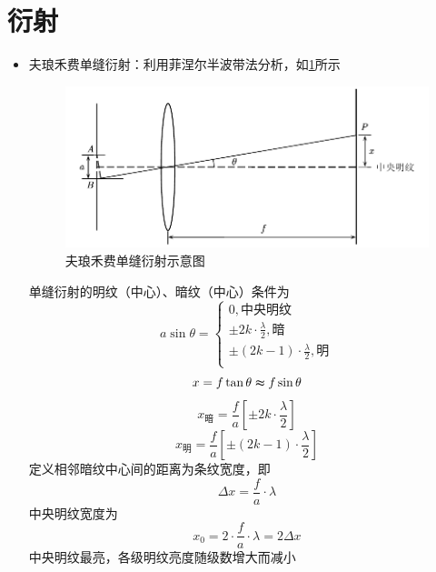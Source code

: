 \documentclass[12pt, a4paper, twoside]{ctexbook}
\begin{document}
\section{衍射}
\begin{itemize}
    \item {\sonti 夫琅禾费单缝衍射}：利用菲涅尔半波带法分析，如\textcolor{blue}{\cref{fig:夫琅禾费单缝衍射}}所示
    \begin{figure}[H]
        \centerline{\includegraphics[scale=0.90]{夫琅禾费单缝衍射.pdf}}
        \caption{夫琅禾费单缝衍射示意图}\label{fig:夫琅禾费单缝衍射}
    \end{figure}
    单缝衍射的明纹（中心）、暗纹（中心）条件为
    $$
    a\sin\theta=\left\{ \begin{array}{l}
        0,\text{中央明纹}\\
        \pm 2k\cdot \frac{\lambda}{2},\text{暗}\\
        \pm \left( 2k-1 \right) \cdot \frac{\lambda}{2},\text{明}\\
    \end{array} \right. 
    $$
    $$
    x=f\tan\theta\thickapprox f\sin\theta
    $$
    $$
    x_\text{暗}=\frac{f}{a}\left[\pm 2k\cdot\frac{\lambda}{2}\right]
    $$
    $$
    x_\text{明}=\frac{f}{a}\left[\pm\left(2k-1\right)\cdot\frac{\lambda}{2}\right]
    $$
    定义相邻暗纹中心间的距离为条纹宽度，即
    $$
    \Delta x=\frac{f}{a}\cdot\lambda
    $$
    中央明纹宽度为
    $$
    x_0=2\cdot\frac{f}{a}\cdot\lambda=2\Delta x
    $$
    中央明纹最亮，各级明纹亮度随级数增大而减小
    

\end{itemize}
\end{document}
